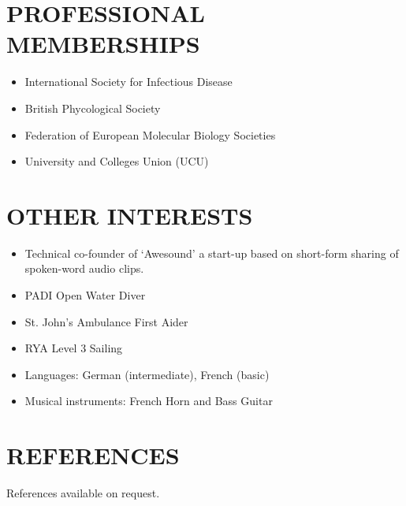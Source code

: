 \documentclass{res}
\begin{document}
\begin{resume}
\begin{itemize}
    \end{itemize}


 \section{PROFESSIONAL MEMBERSHIPS}
          \vspace{-1pt}
 \begin{itemize}
\item International Society for Infectious Disease
\item British Phycological Society
\item Federation of European Molecular Biology Societies
\item University and Colleges Union (UCU)
\end{itemize}


	
 \section{OTHER INTERESTS}
          \vspace{-1pt}
 \begin{itemize}
     \item Technical co-founder of `Awesound' a start-up 
         based on short-form sharing of spoken-word audio clips.
     \item PADI Open Water Diver
     \item St. John's Ambulance First Aider
     \item RYA Level 3 Sailing
     \item Languages: German (intermediate), French (basic)
     \item Musical instruments: French Horn and Bass Guitar
 \end{itemize}

 \section{REFERENCES}
 References available on request.

\end{resume}
\end{document}
